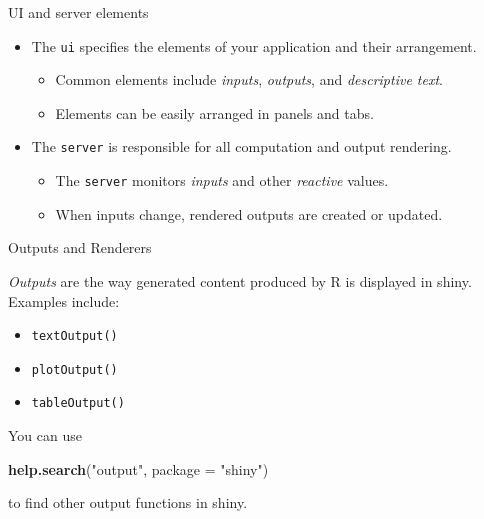 \documentclass[
  12pt,
  ignorenonframetext,
]{beamer}
\newenvironment{Shaded}{\begin{snugshade}}{\end{snugshade}}
\newcommand{\DataTypeTok}[1]{\textcolor[rgb]{0.13,0.29,0.53}{#1}}
\newcommand{\KeywordTok}[1]{\textcolor[rgb]{0.13,0.29,0.53}{\textbf{#1}}}
\newcommand{\NormalTok}[1]{#1}
\newcommand{\StringTok}[1]{\textcolor[rgb]{0.31,0.60,0.02}{#1}}
\providecommand{\tightlist}{%
  \setlength{\itemsep}{0pt}\setlength{\parskip}{0pt}}
\begin{document}
\begin{frame}[fragile]{UI and server elements}
\protect\hypertarget{ui-and-server-elements}{}

\begin{itemize}
\tightlist
\item
  The \texttt{ui} specifies the elements of your application and their
  arrangement.

  \begin{itemize}
  \tightlist
  \item
    Common elements include \emph{inputs}, \emph{outputs}, and
    \emph{descriptive text}.
  \item
    Elements can be easily arranged in panels and tabs.
  \end{itemize}
\item
  The \texttt{server} is responsible for all computation and output
  rendering.

  \begin{itemize}
  \tightlist
  \item
    The \texttt{server} monitors \emph{inputs} and other \emph{reactive}
    values.
  \item
    When inputs change, rendered outputs are created or updated.
  \end{itemize}
\end{itemize}

\end{frame}

\begin{frame}[fragile]{Outputs and Renderers}
\protect\hypertarget{outputs-and-renderers}{}

\emph{Outputs} are the way generated content produced by R is displayed
in shiny. Examples include:

\begin{itemize}
\item
  \texttt{textOutput()}
\item
  \texttt{plotOutput()}
\item
  \texttt{tableOutput()}
\end{itemize}

You can use

\begin{Shaded}
\begin{Highlighting}[]
\KeywordTok{help.search}\NormalTok{(}\StringTok{"output"}\NormalTok{, }\DataTypeTok{package =} \StringTok{"shiny"}\NormalTok{)}
\end{Highlighting}
\end{Shaded}

to find other output functions in shiny.

\end{frame}
\end{document}
